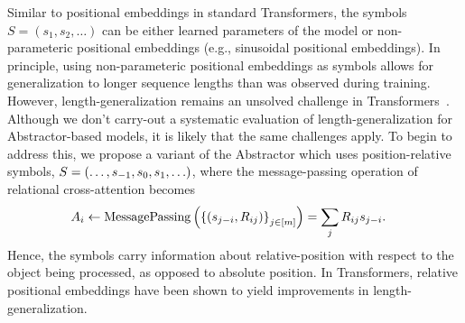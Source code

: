 \begin{remark}\rm
    Similar to positional embeddings in standard Transformers, the symbols $S = (s_1, s_2, \ldots)$ can be either learned parameters of the model or non-parameteric positional embeddings (e.g., sinusoidal positional embeddings). In principle, using non-parameteric positional embeddings as symbols allows for generalization to longer sequence lengths than was observed during training. However, length-generalization remains an unsolved challenge in Transformers~\citep{kazemnejadImpactPositionalEncoding2023}. Although we don't carry-out a systematic evaluation of length-generalization for Abstractor-based models, it is likely that the same challenges apply. To begin to address this, we propose a variant of the Abstractor which uses position-relative symbols, $S = \left(\ldots, s_{-1}, s_0, s_1, \ldots\right)$, where the message-passing operation of relational cross-attention becomes
    \begin{equation}\label{eq:position_relative_symbols}
        \begin{split}
            A_i &\gets \mathrm{MessagePassing}\paren{\set{(s_{j-i}, R_{ij})}_{j \in [\m]}}%
            = \sum_{j} R_{ij} s_{j-i}.
        \end{split}
    \end{equation}
    Hence, the symbols carry information about relative-position with respect to the object being processed, as opposed to absolute position. In Transformers, relative positional embeddings have been shown to yield improvements in length-generalization.
\end{remark}

%